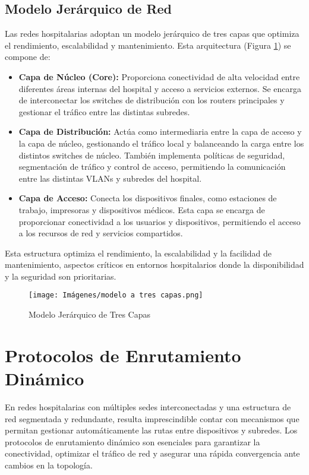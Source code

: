 \subsection{Modelo Jerárquico de Red}
Las redes hospitalarias adoptan un modelo jerárquico de tres capas que optimiza el rendimiento, escalabilidad y mantenimiento. Esta arquitectura (Figura \ref{fig:3capas}) se compone de:
\begin{itemize}
    \item \textbf{Capa de Núcleo (Core):} Proporciona conectividad de alta velocidad entre diferentes áreas internas del hospital y acceso a servicios externos. Se encarga de 
    interconectar los switches de distribución con los routers principales y gestionar el tráfico entre las distintas subredes.
    \item \textbf{Capa de Distribución:} Actúa como intermediaria entre la capa de acceso y la capa de núcleo, gestionando el tráfico local y balanceando la carga
    entre los distintos switches de núcleo. También implementa políticas de seguridad, segmentación de tráfico y control de acceso, permitiendo la comunicación entre las distintas 
    VLANs y subredes del hospital.
    \item \textbf{Capa de Acceso:} Conecta los dispositivos finales, como estaciones de trabajo, impresoras y dispositivos médicos. Esta capa se encarga de proporcionar
    conectividad a los usuarios y dispositivos, permitiendo el acceso a los recursos de red y servicios compartidos. 
\end{itemize}
Esta estructura optimiza el rendimiento, la escalabilidad y la facilidad de mantenimiento, aspectos críticos en entornos hospitalarios donde la disponibilidad y la seguridad son prioritarias.
\begin{figure}[H]
    \centering
    \texttt{[image: Imágenes/modelo a tres capas.png]}
    \caption{Modelo Jerárquico de Tres Capas \cite{3capas}}
    \label{fig:3capas}
\end{figure}

\section{Protocolos de Enrutamiento Dinámico}
En redes hospitalarias con múltiples sedes interconectadas y una estructura de red segmentada y redundante, resulta imprescindible contar con mecanismos que permitan 
gestionar automáticamente las rutas entre dispositivos y subredes. Los protocolos de enrutamiento dinámico son esenciales para garantizar la conectividad, optimizar el 
tráfico de red y asegurar una rápida convergencia ante cambios en la topología.

